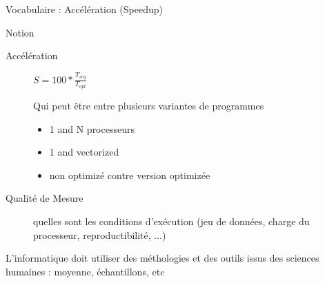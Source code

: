 \begin{Frame}{Vocabulaire : Accélération (Speedup)}

  \begin{block}{Notion}
    \begin{description}
    \item[Accélération] $S = 100*\frac{T_{seq}}{T_{opt}}$

      Qui peut être entre plusieurs variantes de programmes
      \begin{itemize}
      \item 1 and N processeurs
      \item 1 and vectorized
      \item non optimizé contre version optimizée
              \end{itemize}
      
    \item[Qualité de Mesure] quelles sont les conditions d'exécution
      (jeu de données, charge du processeur, reproductibilité, ...)

    \end{description}
    
    L'informatique doit utiliser des méthologies et des outils issus
    des sciences humaines : moyenne, échantillons, etc
  \end{block}
\end{Frame}


